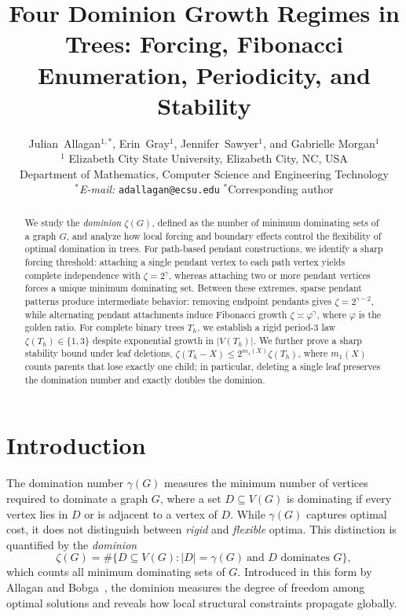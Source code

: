 \documentclass[11pt]{article}
\title{Four Dominion Growth Regimes in Trees: Forcing, Fibonacci Enumeration, Periodicity, and Stability}
\author{Julian~Allagan$^{1,*}$, Erin~Gray$^{1}$, Jennifer~Sawyer$^{1}$, and Gabrielle Morgan$^{1}$  \\
  \small $^{1}$ Elizabeth City State University, Elizabeth City, NC, USA \\
 \small Department of Mathematics, Computer Science and Engineering Technology\\
  \small $^{*}$\textit{E-mail:} \texttt{adallagan@ecsu.edu}\qquad
  \small $^{*}$Corresponding author
}
\date{}
\theoremstyle{definition}
\theoremstyle{remark}
\newcommand{\gam}{\gamma}
\newcommand{\zet}{\zeta}
\begin{document}
\maketitle

\begin{abstract}
We study the \emph{dominion} $\zeta(G)$, defined as the number of minimum dominating sets of a graph $G$,
and analyze how local forcing and boundary effects control the flexibility of optimal domination in trees.
For path-based pendant constructions, we identify a sharp forcing threshold: attaching a single pendant
vertex to each path vertex yields complete independence with $\zeta=2^{\gamma}$, whereas attaching two or
more pendant vertices forces a unique minimum dominating set.
Between these extremes, sparse pendant patterns produce intermediate behavior: removing endpoint pendants
gives $\zeta=2^{\gamma-2}$, while alternating pendant attachments induce Fibonacci growth
$\zeta\asymp \varphi^{\gamma}$, where $\varphi$ is the golden ratio.
For complete binary trees $T_h$, we establish a rigid period-$3$ law $\zeta(T_h)\in\{1,3\}$ despite
exponential growth in $|V(T_h)|$.
We further prove a sharp stability bound under leaf deletions,
$\zeta(T_h-X)\le 2^{m_1(X)}\zeta(T_h)$, where $m_1(X)$ counts parents that lose exactly one child;
in particular, deleting a single leaf preserves the domination number and exactly doubles the dominion.
\end{abstract}


\section{Introduction}

The domination number $\gam(G)$ measures the minimum number of vertices required to dominate a graph $G$,
where a set $D\subseteq V(G)$ is dominating if every vertex lies in $D$ or is adjacent to a vertex of $D$.
While $\gam(G)$ captures optimal cost, it does not distinguish between \emph{rigid} and \emph{flexible}
optima. This distinction is quantified by the \emph{dominion}
\[
\zet(G)=\#\{D\subseteq V(G): |D|=\gam(G)\ \text{and $D$ dominates $G$}\},
\]
which counts all minimum dominating sets of $G$. Introduced in this form by
Allagan and Bobga~\cite{AllaganBobga2021}, the dominion measures the degree of freedom among optimal
solutions and reveals how local structural constraints propagate globally.
\end{document}
